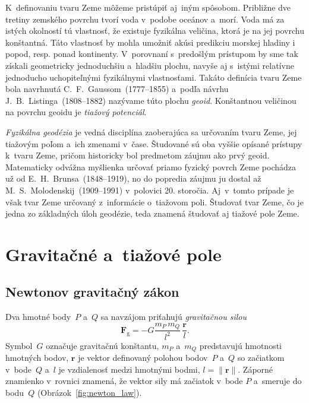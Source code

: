 \documentclass[a4paper,12pt]{book}
\newcommand{\gidx}{\mathrm g}
\let\vec\mathbf
\begin{document}
K~definovaniu tvaru Zeme môžeme pristúpiť aj~iným spôsobom.  Približne dve 
tretiny zemského povrchu tvorí voda v~podobe oceánov a~morí.  Voda má za istých 
okolností tú vlastnosť, že existuje fyzikálna veličina, ktorá je na jej povrchu 
konštantná.  Táto vlastnosť by mohla umožniť akúsi predikciu morskej hladiny 
i popod, resp. ponad kontinenty.  V~porovnaní s~predošlým prístupom by sme tak 
získali geometricky jednoduchšiu a~hladšiu plochu, navyše aj s~istými relatívne 
jednoducho uchopiteľnými fyzikálnymi vlastnosťami.  Takáto definícia tvaru Zeme 
bola navrhnutá C.~F.~Gaussom~(1777--1855) a~podľa návrhu 
J.~B.~Listinga~(1808--1882) nazývame túto plochu \emph{geoid}.  Konštantnou 
veličinou na povrchu geoidu je \emph{tiažový potenciál}.

\emph{Fyzikálna geodézia} je vedná disciplína zaoberajúca sa určovaním tvaru 
Zeme, jej tiažovým poľom a~ich zmenami v~čase.  Študované sú oba vyššie opísané 
prístupy k~tvaru Zeme, pričom historicky bol predmetom záujmu ako prvý geoid.  
Matematicky odvážna myšlienka určovať priamo fyzický povrch Zeme pochádza už od 
E.~H.~Brunsa~(1848--1919), no do popredia záujmu ju dostal až 
M.~S.~Molodenskij~(1909--1991) v~polovici 20. storočia.  Aj~v~tomto prípade je 
však tvar Zeme určovaný z~informácie o~tiažovom poli.  Študovať tvar Zeme, čo 
je jedna zo základných úloh geodézie, teda znamená študovať aj tiažové pole 
Zeme.







\chapter{Gravitačné a~tiažové pole}
\label{sec:gravitational_and_gravity_field}






\section{Newtonov gravitačný zákon}
\label{sec:newton_law}

Dva hmotné body~$P$ a~$Q$ sa navzájom priťahujú \emph{gravitačnou silou}
%
\begin{equation}
\label{eq:newton_law}
\vec F_\gidx = -G \frac{m_P \, m_Q}{l^2} \, \frac{\vec r}{l}{.}
\end{equation}
%
Symbol~$G$ označuje gravitačnú konštantu, $m_P$ a~$m_Q$ predstavujú hmotnosti 
hmotných bodov, $\vec r$ je vektor definovaný polohou bodov~$P$ a~$Q$ so 
začiatkom v~bode~$Q$ a~$l$ je vzdialenosť medzi hmotnými bodmi, $l = \| \vec 
r \|$.  Záporné znamienko v~rovnici znamená, že vektor sily má začiatok v~bode 
$P$ a~smeruje do bodu~$Q$ (Obrázok~\ref{fig:newton_law}).
\end{document}
